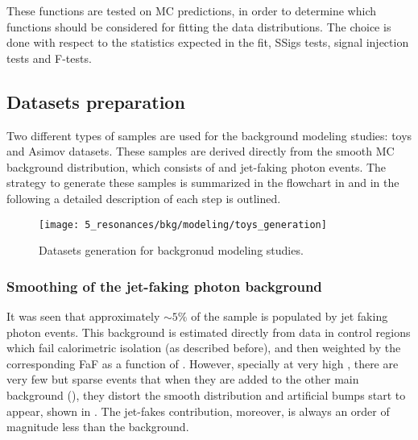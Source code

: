 These functions are tested on \ac{MC} predictions, in order to determine which functions should be considered for fitting the data distributions. 
The choice is done with respect to the statistics expected in the \myj fit, \acp{SSig} tests, signal injection tests and F-tests.




\subsection{Datasets preparation}
\label{subsec:bkg:modeling:preparation}

Two different types of samples are used for the background modeling studies: toys and Asimov datasets. These samples are derived directly from the smooth \ac{MC} background distribution, which consists of \gammajet and jet-faking photon events. The strategy to generate these samples is summarized in the flowchart in \Fig{\ref{fig:bkg:modeling:preparation:datasets_generation}} and in the following a detailed description of each step is outlined.

\begin{figure}[ht!]
    \centering
    \texttt{[image: 5\_resonances/bkg/modeling/toys\_generation]}
    \caption{Datasets generation for backgronud modeling studies.}
    \label{fig:bkg:modeling:preparation:datasets_generation}
\end{figure}



\subsubsection{Smoothing of the jet-faking photon background}
\label{subsubsec:bkg:modeling:preparation:jfakes_smooth}


It was seen that approximately \(\sim 5\%\) of the \gammajet sample is populated by jet faking photon events. This background is estimated directly from data in control regions which fail calorimetric isolation (as described before), and then weighted by the corresponding \ac{FaF} as a function of \ptgam. However, specially at very high \myj, there are very few but sparse events that when they are added to the other main background (\gammajet), they distort the smooth distribution and artificial bumps start to appear, shown in \Fig{\ref{fig:bkg:modeling:preparation:jfakes_smooth:bkg_myj_distribution}}.
The jet-fakes contribution, moreover, is always an order of magnitude less than the \gammajet background.

